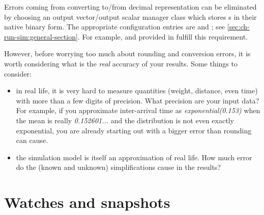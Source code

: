 %
%
%
%


Errors coming from converting to/from decimal representation can be
eliminated by choosing an output vector/output scalar manager class
which stores s in their native binary form.
The appropriate configuration entries are 
and ; see \ref{sec:ch-run-sim:general-section}.
For example,  and 
provided in  fulfill this requirement.

However, before worrying too much about rounding and conversion errors,
it is worth considering what is the \textit{real} accuracy of your results.
Some things to consider:

\begin{itemize}
  \item{in real life, it is very hard to measure quantities (weight, distance,
     even time) with more than a few digits of precision. What precision
     are your input data? For example, if you approximate inter-arrival
     time as \textit{exponential(0.153)} when the mean is really
     \textit{0.152601...} and the distribution is not even exactly exponential,
     you are already starting out with a bigger error than rounding can cause.}

  \item{the simulation model is itself an approximation of real life. How much
     error do the (known and unknown) simplifications cause in the results?}
\end{itemize}




\section{Watches and snapshots}

